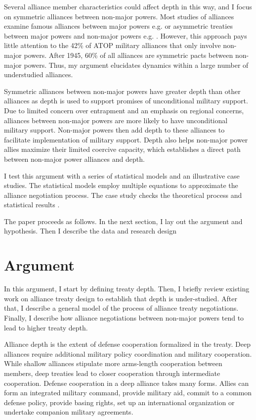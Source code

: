 \documentclass[12pt]{article}
\begin{document}
Several alliance member characteristics could affect depth in this way, and I focus on symmetric alliances between non-major powers. 
Most studies of alliances examine famous alliances between major powers e.g. \citep{Snyder1997} or asymmetric treaties between major powers and non-major powers e.g. \citep{Morrow1991, Yarhi-Miloetal2016}. 
However, this approach pays little attention to the 42\% of ATOP military alliances that only involve non-major powers. %
After 1945, 60\% of all alliances are symmetric pacts between non-major powers. %
Thus, my argument elucidates dynamics within a large number of understudied alliances. 

Symmetric alliances between non-major powers have greater depth than other alliances as depth is used to support promises of unconditional military support. 
Due to limited concern over entrapment and an emphasis on regional concerns, alliances between non-major powers are more likely to have unconditional military support. 
Non-major powers then add depth to these alliances to facilitate implementation of military support. %
Depth also helps non-major power allies maximize their limited coercive capacity, which establishes a direct path between non-major power alliances and depth. %


I test this argument with a series of statistical models and an illustrative case studies.
The statistical models employ multiple equations to approximate the alliance negotiation process. 
The case study checks the theoretical process and statistical results \citep{Seawright2016}.  


The paper proceeds as follows. 
In the next section, I lay out the argument and hypothesis. 
Then I describe the data and research design 

\section{Argument}

In this argument, I start by defining treaty depth. 
Then, I briefly review existing work on alliance treaty design to establish that depth is under-studied. 
After that, I describe a general model of the process of alliance treaty negotiations. 
Finally, I describe how alliance negotiations between non-major powers tend to lead to higher treaty depth. 


Alliance depth is the extent of defense cooperation formalized in the treaty. 
Deep alliances require additional military policy coordination and military cooperation. 
While shallow alliances stipulate more arms-length cooperation between members, deep treaties lead to closer cooperation through intermediate cooperation. 
Defense cooperation in a deep alliance takes many forms. 
Allies can form an integrated military command, provide military aid, commit to a common defense policy, provide basing rights, set up an international organization or undertake companion military agreements. 
\end{document}
